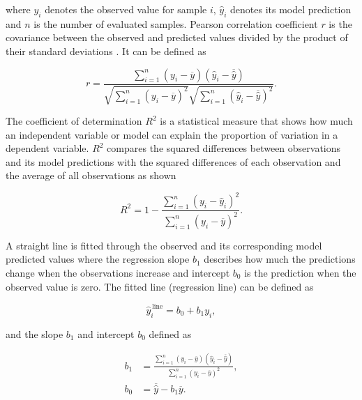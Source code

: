 where \(y_i\) denotes the observed value for sample \(i\), \(\widehat{y}_i\) denotes its model prediction and \(n\) is the number of evaluated samples. Pearson correlation coefficient \(r\) is the covariance between the observed and predicted values divided by the product of their standard deviations \cite{benesty2009pearson}. It can be defined as 

\begin{equation}
r=
\frac{\sum_{i=1}^{n}\left(y_i-\overline{y}\right)
\left(\widehat{y}_i-\overline{\widehat{y}}\right)}
{\sqrt{\sum_{i=1}^{n}\left(y_i-\overline{y}\right)^2}
\sqrt{\sum_{i=1}^{n}\left(\widehat{y}_i-\overline{\widehat{y}}\right)^2}}.
\label{eq:pearson_correlation}
\end{equation}

The coefficient of determination \(R^2\) is a statistical measure that shows how much an independent variable or model can explain the proportion of variation in a dependent variable. \(R^2\) compares the squared differences between observations and its model predictions with the squared differences of each observation and the average of all observations as shown

\begin{equation}
R^2=1-
\frac{\sum_{i=1}^{n}\left(y_i-\widehat{y}_i\right)^2}
{\sum_{i=1}^{n}\left(y_i-\overline{y}\right)^2}.
\label{eq:coefficient_determination}
\end{equation}

A straight line is fitted through the observed and its corresponding model predicted values where the regression slope \(b_1\) describes how much the predictions change when the observations increase and intercept \(b_0\) is the prediction when the observed value is zero. The fitted line (regression line) can be defined as

\begin{equation}
\widehat{y}^{\,\mathrm{line}}_i=b_0+b_1y_i,
\label{eq:prediction_regression_line}
\end{equation}

and the slope \(b_1\) and intercept \(b_0\) defined as

\begin{align}
b_1 &=
\frac{\sum_{i=1}^{n}\left(y_i-\overline{y}\right)
\left(\widehat{y}_i-\overline{\widehat{y}}\right)}
{\sum_{i=1}^{n}\left(y_i-\overline{y}\right)^2},
\label{eq:regression_slope}\\
b_0 &= \overline{\widehat{y}}-b_1\overline{y}.
\label{eq:regression_intercept}
\end{align}

